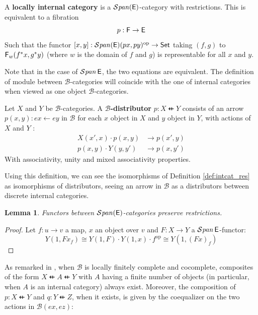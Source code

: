\documentclass[10pt,a4paper]{article}
\newcommand{\ca}[1]{\mathcal{#1}}
\newcommand{\cat}[1]{\textcat{#1}}
\newcommand{\textcat}[1]{{\normalfont\textsf{#1}}}
\newcommand{\dfrom}{\nvleftarrow}
\newcommand{\from}{\leftarrow}
\newcommand{\op}{\mathrm{op}}
\newcommand{\simeqq}{\cong}
\DeclareMathOperator{\bSpan}{\ca{S}\mathit{pan}}
\theoremstyle{plain}
\newtheorem{lemma}[theorem]{Lemma}
\theoremstyle{definition}
\theoremstyle{remark}
\begin{document}
\begin{definition}
    A \textbf{locally internal category} is a $\bSpan(\cat{E})$-category with restrictions. This is equivalent to a fibration
    $$p : \cat F \to \cat E$$
    Such that the functor $[x, y] : \bSpan(\cat E)(px, py)^\op \to \cat{Set}$ taking $(f, g)$ to $\cat F_w(f^*x, g^*y)$ (where $w$ is the domain of $f$ and $g$) is representable for all $x$ and $y$.
\end{definition}

Note that in the case of $\bSpan\cat E$, the two equations are equivalent. The definition of module between $\ca B$-categories will coincide with the one of internal categories when viewed as one object $\ca B$-categories.

\begin{definition}
    Let $X$ and $Y$ be $\ca B$-categories. A \textbf{$\ca B$-distributor} $p : X \dfrom Y$ consists of an arrow $p(x, y) : ex \from ey$ in $\ca B$ for each $x$ object in $X$ and $y$ object in $Y$, with actions of $X$ and $Y$ :
    \begin{align*}
        X(x', x) \cdot p(x, y) &\to p(x', y)\\
        p(x, y) \cdot Y(y, y') &\to p(x, y')
    \end{align*}
    With associativity, unity and mixed associativity properties.
\end{definition}

Using this definition, we can see the isomorphisms of Definition \ref{def:intcat_res} as isomorphisms of distributors, seeing an arrow in $\ca B$ as a distributors between discrete internal categories.

\begin{lemma}
    Functors between $\bSpan(\cat E)$-categories preserve restrictions.
\end{lemma}

\begin{proof}
    Let $f : u \to v$ a map, $x$ an object over $v$ and $F : X \to Y$ a $\bSpan\cat E$-functor:
    $$Y(1, Fx_f) \simeqq Y(1, F) \cdot Y(1, x) \cdot f^\op \simeqq Y(1, (Fx)_f)$$
\end{proof}

As remarked in \cite{bettiwalters_completness}, when $\ca B$ is locally finitely complete and cocomplete, composites of the form $X \dfrom A \dfrom Y$ with $A$ having a finite number of objects (in particular, when $A$ is an internal category) always exist. Moreover, the composition of $p : X \dfrom Y$ and $q : Y \dfrom Z$, when it exists, is given by the coequalizer on the two actions in $\ca B(ex, ez)$:
\end{document}

